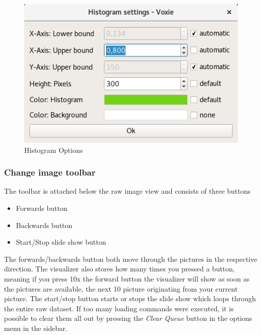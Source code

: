 \begin{figure}[h!]
  \centering
  \includegraphics[scale=0.5]{img/2d/histosettings}
  \caption{Histogram Options}
\end{figure}  

\subsubsection{Change image toolbar}

The toolbar is attached below the raw image view and consists of three buttons

\begin{itemize}
\item Forwards button
\item Backwards button
\item Start/Stop slide show button 
\end{itemize}

The forwards/backwards button both move through the pictures in the respective direction. The visualizer also stores how many times you pressed a button, meaning if you press 10x the forward button the visualizer will show as soon as the pictures are available, the next 10 picture originating from your current picture.
The start/stop button starts or stops the slide show which loops through the entire raw dataset. If too many loading commands were executed, it is possible to clear them all out by pressing the \textit{Clear Queue} button in the options menu in the sidebar.
